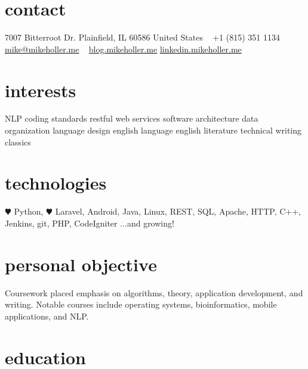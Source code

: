 \documentclass[]{friggeri-cv} %
\begin{document}


\begin{aside} %
\section{contact}
7007 Bitterroot Dr.
Plainfield, IL 60586
United States
~
+1 (815) 351 1134
~
\href{mailto:mike@mikeholler.me}{mike@mikeholler.me}
~
\href{http://blog.mikeholler.me}{blog.mikeholler.me}
\href{http://linkedin.mikeholler.me}{linkedin.mikeholler.me}
\section{interests}
NLP
coding standards
restful web services
software architecture
data organization
language design
english language
english literature
technical writing
classics
\section{technologies}
{\color{red} $\varheartsuit$} Python, {\color{red} $\varheartsuit$} Laravel,
Android, Java, Linux,
REST, SQL, Apache,
HTTP, C++, Jenkins,
git, PHP, CodeIgniter
...and growing!
\end{aside}

\section{personal objective}
Coursework placed emphasis on algorithms, theory, application development, and writing.
Notable courses include operating systems, bioinformatics, mobile applications, and NLP.


\section{education}
\end{document}
